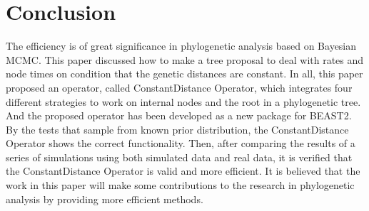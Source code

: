 \documentclass{bmcart}
\begin{document}
\section*{Conclusion}
The efficiency is of great significance in phylogenetic analysis based on Bayesian MCMC. This paper discussed how to make a tree proposal to deal with rates and node times on condition that the genetic distances are constant. In all, this paper proposed an operator, called ConstantDistance Operator, which integrates four different strategies to work on internal nodes and the root in a phylogenetic tree. And the proposed operator has been developed as a new package for BEAST2. By the tests that sample from known prior distribution, the ConstantDistance Operator shows the correct functionality. Then, after comparing the results of a series of simulations using both simulated data and real data, it is verified that the ConstantDistance Operator is valid and more efficient. It is believed that the work in this paper will make some contributions to the research in phylogenetic analysis by providing more efficient methods.
\end{document}
